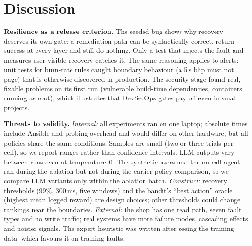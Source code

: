 \section{Discussion}
\label{sec:discussion}


\textbf{Resilience as a release criterion.} The seeded bug shows why recovery deserves its own gate:
a remediation path can be syntactically correct, return success at every layer and still do nothing.
Only a test that injects the fault and measures user-visible recovery catches it. The same reasoning
applies to alerts: unit tests for burn-rate rules caught boundary behaviour (a 5\,s blip must not page)
that is otherwise discovered in production. The security stage found real, fixable problems on its
first run (vulnerable build-time dependencies, containers running as root), which illustrates that
DevSecOps gates pay off even in small projects.

\textbf{Threats to validity.} \emph{Internal:} all experiments ran on one laptop; absolute times
include Ansible and probing overhead and would differ on other hardware, but all policies share the
same conditions. Samples are small (two or three trials per cell), so we report ranges rather than
confidence intervals. LLM outputs vary between runs even at temperature~0. The synthetic users and
the on-call agent ran during the ablation but not during the earlier policy comparison, so we compare
LLM variants only within the ablation batch. \emph{Construct:} recovery thresholds (99\%, 300\,ms,
five windows) and the bandit's ``best action'' oracle (highest mean logged reward) are design choices;
other thresholds could change rankings near the boundaries. \emph{External:} the shop has one read
path, seven fault types and no write traffic; real systems have more failure modes, cascading effects
and noisier signals. The expert heuristic was written after seeing the training data, which favours
it on training faults.
